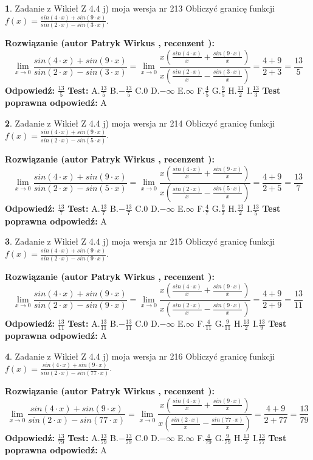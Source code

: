 \documentclass[12pt, a4paper]{article}
\theoremstyle{definition} %
\newtheorem{zad}{}
\newcommand{\zadStart}[1]{\begin{zad}#1\newline}
\newcommand{\zadStop}{\end{zad}}
\newcommand{\rozwStart}[2]{\noindent \textbf{Rozwiązanie (autor #1 , recenzent #2): }\newline}
\newcommand{\rozwStop}{\newline}
\newcommand{\odpStart}{\noindent \textbf{Odpowiedź:}\newline}
\newcommand{\odpStop}{\newline}
\newcommand{\testStart}{\noindent \textbf{Test:}\newline}
\newcommand{\testStop}{\newline}
\newcommand{\kluczStart}{\noindent \textbf{Test poprawna odpowiedź:}\newline}
\newcommand{\kluczStop}{\newline}
\begin{document}
\zadStart{Zadanie z Wikieł Z 4.4 j) moja wersja nr 213}
Obliczyć granicę funkcji $f(x)=\frac{sin(4\cdot x) +sin(9\cdot x)}{sin(2\cdot x) -sin(3\cdot x)}$.
\zadStop
\rozwStart{Patryk Wirkus}{}
$$\lim\limits_{x\to 0}\frac{sin(4\cdot x) +sin(9\cdot x)}{sin(2\cdot x) -sin(3\cdot x)}=\lim\limits_{x\to 0}\frac{x(\frac{sin(4\cdot x)}{x}+\frac{sin(9\cdot x)}{x})}{x(\frac{sin(2\cdot x)}{x}-\frac{sin(3\cdot x)}{x})}=\frac{4+9}{2+3} = \frac{13}{5}$$
\rozwStop
\odpStart
$\frac{13}{5}$
\odpStop
\testStart
A.$\frac{13}{5}$
B.$-\frac{13}{5}$
C.$0$
D.$-\infty$
E.$\infty$
F.$\frac{4}{5}$
G.$\frac{9}{5}$
H.$\frac{13}{2}$
I.$\frac{13}{3}$
\testStop
\kluczStart
A
\kluczStop



\zadStart{Zadanie z Wikieł Z 4.4 j) moja wersja nr 214}
Obliczyć granicę funkcji $f(x)=\frac{sin(4\cdot x) +sin(9\cdot x)}{sin(2\cdot x) -sin(5\cdot x)}$.
\zadStop
\rozwStart{Patryk Wirkus}{}
$$\lim\limits_{x\to 0}\frac{sin(4\cdot x) +sin(9\cdot x)}{sin(2\cdot x) -sin(5\cdot x)}=\lim\limits_{x\to 0}\frac{x(\frac{sin(4\cdot x)}{x}+\frac{sin(9\cdot x)}{x})}{x(\frac{sin(2\cdot x)}{x}-\frac{sin(5\cdot x)}{x})}=\frac{4+9}{2+5} = \frac{13}{7}$$
\rozwStop
\odpStart
$\frac{13}{7}$
\odpStop
\testStart
A.$\frac{13}{7}$
B.$-\frac{13}{7}$
C.$0$
D.$-\infty$
E.$\infty$
F.$\frac{4}{7}$
G.$\frac{9}{7}$
H.$\frac{13}{2}$
I.$\frac{13}{5}$
\testStop
\kluczStart
A
\kluczStop



\zadStart{Zadanie z Wikieł Z 4.4 j) moja wersja nr 215}
Obliczyć granicę funkcji $f(x)=\frac{sin(4\cdot x) +sin(9\cdot x)}{sin(2\cdot x) -sin(9\cdot x)}$.
\zadStop
\rozwStart{Patryk Wirkus}{}
$$\lim\limits_{x\to 0}\frac{sin(4\cdot x) +sin(9\cdot x)}{sin(2\cdot x) -sin(9\cdot x)}=\lim\limits_{x\to 0}\frac{x(\frac{sin(4\cdot x)}{x}+\frac{sin(9\cdot x)}{x})}{x(\frac{sin(2\cdot x)}{x}-\frac{sin(9\cdot x)}{x})}=\frac{4+9}{2+9} = \frac{13}{11}$$
\rozwStop
\odpStart
$\frac{13}{11}$
\odpStop
\testStart
A.$\frac{13}{11}$
B.$-\frac{13}{11}$
C.$0$
D.$-\infty$
E.$\infty$
F.$\frac{4}{11}$
G.$\frac{9}{11}$
H.$\frac{13}{2}$
I.$\frac{13}{9}$
\testStop
\kluczStart
A
\kluczStop



\zadStart{Zadanie z Wikieł Z 4.4 j) moja wersja nr 216}
Obliczyć granicę funkcji $f(x)=\frac{sin(4\cdot x) +sin(9\cdot x)}{sin(2\cdot x) -sin(77\cdot x)}$.
\zadStop
\rozwStart{Patryk Wirkus}{}
$$\lim\limits_{x\to 0}\frac{sin(4\cdot x) +sin(9\cdot x)}{sin(2\cdot x) -sin(77\cdot x)}=\lim\limits_{x\to 0}\frac{x(\frac{sin(4\cdot x)}{x}+\frac{sin(9\cdot x)}{x})}{x(\frac{sin(2\cdot x)}{x}-\frac{sin(77\cdot x)}{x})}=\frac{4+9}{2+77} = \frac{13}{79}$$
\rozwStop
\odpStart
$\frac{13}{79}$
\odpStop
\testStart
A.$\frac{13}{79}$
B.$-\frac{13}{79}$
C.$0$
D.$-\infty$
E.$\infty$
F.$\frac{4}{79}$
G.$\frac{9}{79}$
H.$\frac{13}{2}$
I.$\frac{13}{77}$
\testStop
\kluczStart
A
\kluczStop
\end{document}
